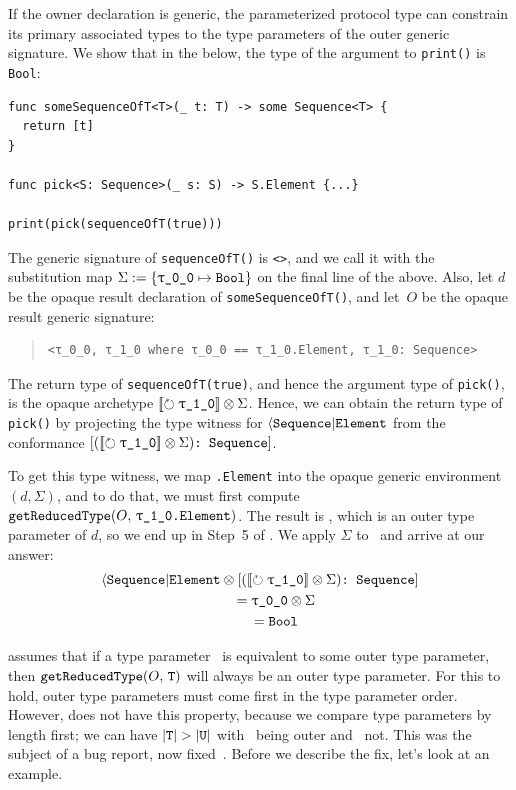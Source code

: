 \documentclass[../generics]{subfiles}
\begin{document}
\begin{example}\label{opaque result parameterized generic example}
If the owner declaration is generic, the parameterized protocol type can constrain its primary associated types to the type parameters of the outer generic signature. We show that in the below, the type of the argument to \texttt{print()} is \texttt{Bool}:
\begin{Verbatim}
func someSequenceOfT<T>(_ t: T) -> some Sequence<T> {
  return [t]
}

func pick<S: Sequence>(_ s: S) -> S.Element {...}

print(pick(sequenceOfT(true)))
\end{Verbatim}
The generic signature of \texttt{sequenceOfT()} is \texttt{<\rT>}, and we call it with the substitution map $\Sigma := \SubstMap{\SubstType{\rT}{Bool}}$ on the final line of the above. Also, let $d$ be the opaque result declaration of \texttt{someSequenceOfT()}, and let~$O$ be the opaque result generic signature:
\begin{quote}
\begin{verbatim}
<τ_0_0, τ_1_0 where τ_0_0 == τ_1_0.Element, τ_1_0: Sequence>
\end{verbatim}
\end{quote}
The return type of \texttt{sequenceOfT(true)}, and hence the argument type of \texttt{pick()}, is the opaque archetype $\Oy \otimes \Sigma$. Hence, we can obtain the return type of \texttt{pick()} by projecting the type witness for $\langle\texttt{Sequence}|\texttt{Element}$ from the conformance $\ConfReq{$(\Oy \otimes \Sigma)$}{Sequence}$.

To get this type witness, we map \texttt{\rO.Element} into the opaque generic environment $(d,\Sigma)$, and to do that, we must first compute $\Query{getReducedType}{O,\,\texttt{\rO.Element}}$. The result is \rT, which is an outer type parameter of $d$, so we end up in Step~5 of . We apply $\Sigma$ to \rT\ and arrive at our answer:
\begin{gather*}
\AElement \otimes \ConfReq{$(\Oy \otimes \Sigma)$}{Sequence} \\
\qquad {} = \rT \otimes \Sigma \\
\qquad {} = \texttt{Bool}
\end{gather*}
\end{example}

 assumes that if a type parameter \tT\ is equivalent to some outer type parameter, then $\texttt{getReducedType}(O,\,\texttt{T})$ will always be an outer type parameter. For this to hold, outer type parameters must come first in the type parameter order. However,  does not have this property, because we compare type parameters by length first; we can have $|\texttt{T}| > |\texttt{U}|$ with \tT\ being outer and \tU\ not. This was the subject of a bug report, now fixed~\cite{issue59391}. Before we describe the fix, let's look at an example.
\end{document}
